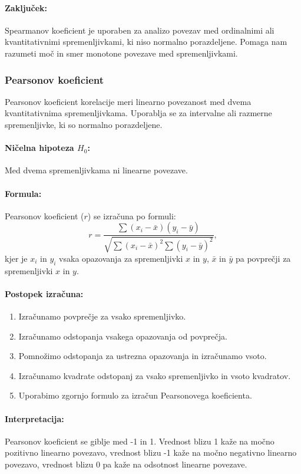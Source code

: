 \paragraph{Zaključek:}
Spearmanov koeficient je uporaben za analizo povezav med ordinalnimi ali kvantitativnimi spremenljivkami, ki niso normalno porazdeljene. Pomaga nam razumeti moč in smer monotone povezave med spremenljivkami.

\subsubsection*{Pearsonov koeficient}

Pearsonov koeficient korelacije meri linearno povezanost med dvema kvantitativnima spremenljivkama. Uporablja se za intervalne ali razmerne spremenljivke, ki so normalno porazdeljene.

\paragraph{Ničelna hipoteza $H_0$:}
Med dvema spremenljivkama ni linearne povezave.

\paragraph{Formula:}
Pearsonov koeficient ($r$) se izračuna po formuli:
\[r = \frac{\sum (x_i - \bar{x})(y_i - \bar{y})}{\sqrt{\sum (x_i - \bar{x})^2 \sum (y_i - \bar{y})^2}},\]
kjer je $x_i$ in $y_i$ vsaka opazovanja za spremenljivki $x$ in $y$, $\bar{x}$ in $\bar{y}$ pa povprečji za spremenljivki $x$ in $y$.

\paragraph{Postopek izračuna:}
\begin{enumerate}
    \item Izračunamo povprečje za vsako spremenljivko.
    \item Izračunamo odstopanja vsakega opazovanja od povprečja.
    \item Pomnožimo odstopanja za ustrezna opazovanja in izračunamo vsoto.
    \item Izračunamo kvadrate odstopanj za vsako spremenljivko in vsoto kvadratov.
    \item Uporabimo zgornjo formulo za izračun Pearsonovega koeficienta.
\end{enumerate}

\paragraph{Interpretacija:}
Pearsonov koeficient se giblje med -1 in 1. Vrednost blizu 1 kaže na močno pozitivno linearno povezavo, vrednost blizu -1 kaže na močno negativno linearno povezavo, vrednost blizu 0 pa kaže na odsotnost linearne povezave.

